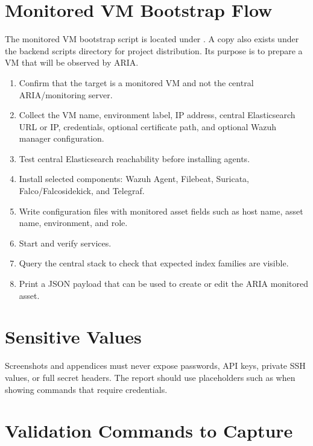 \section{Monitored VM Bootstrap Flow}

The monitored VM bootstrap script is located under . A copy also exists under the backend scripts directory for project distribution. Its purpose is to prepare a VM that will be observed by ARIA.

\begin{enumerate}[leftmargin=1cm]
\item Confirm that the target is a monitored VM and not the central ARIA/monitoring server.
\item Collect the VM name, environment label, IP address, central Elasticsearch URL or IP, credentials, optional certificate path, and optional Wazuh manager configuration.
\item Test central Elasticsearch reachability before installing agents.
\item Install selected components: Wazuh Agent, Filebeat, Suricata, Falco/Falcosidekick, and Telegraf.
\item Write configuration files with monitored asset fields such as host name, asset name, environment, and role.
\item Start and verify services.
\item Query the central stack to check that expected index families are visible.
\item Print a JSON payload that can be used to create or edit the ARIA monitored asset.
\end{enumerate}

\section{Sensitive Values}

Screenshots and appendices must never expose passwords, API keys, private SSH values, or full secret headers. The report should use placeholders such as  when showing commands that require credentials.

\section{Validation Commands to Capture}

